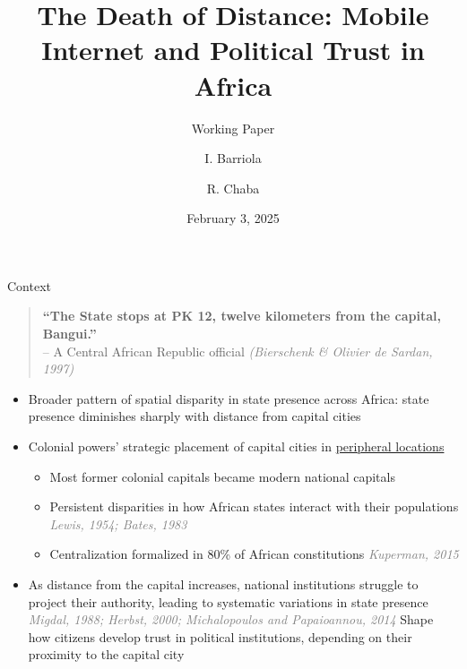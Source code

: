 \documentclass[10pt]{beamer}
\newenvironment{hidepagenumberframe}
  {\setbeamertemplate{footline}{}\begin{frame}}
  {\end{frame}\setbeamertemplate{footline}{
     \hfill{\fontsize{8pt}{16pt}\selectfont\insertframenumber}\hspace{1em}}}
\begin{document}
\author[I. Barriola, R. Chaba]{I. Barriola \and R. Chaba}

\title{The Death of Distance: Mobile Internet and Political Trust in Africa}
\subtitle{Working Paper}
\date{February 3, 2025}


\begin{hidepagenumberframe}
    \titlepage
\end{hidepagenumberframe}

\begin{frame}{Context}
    \begin{quotation}
        \noindent \textbf{``The State stops at PK 12, twelve kilometers from the capital, Bangui.''}\\       
        \hfill -- A Central African Republic official \textcolor{gray}{\textit{(Bierschenk \& Olivier de Sardan, 1997)}} 
        \end{quotation}\smallskip \pause

    \begin{itemize}\setlength\itemsep{1em}
        \item Broader pattern of spatial disparity in state presence across Africa: state presence diminishes sharply with distance from
        capital cities \vfill \pause
        \item Colonial powers’ strategic placement of capital cities in \hyperlink{sample_map}{{peripheral locations}}
        \vfill \label{context}
        \begin{itemize}
            \item Most former colonial capitals became modern national capitals \vfill
            \item Persistent disparities in how African states
            interact with their populations \textcolor{gray}{\textit{Lewis, 1954; Bates, 1983}} \vfill
            \item Centralization formalized in 80\% of African constitutions \textcolor{gray}{\textit{Kuperman, 2015}} \vfill  \pause
        \end{itemize} 
        \item As distance from the capital
        increases, national institutions struggle to project their authority, leading to systematic
        variations in state presence \textcolor{gray}{\textit{Migdal, 1988; Herbst, 2000; Michalopoulos and Papaioannou,
        2014}} \vfill   \pause
        \vspace{1em}
        \centering Shape how citizens develop trust in political institutions, depending on their proximity to the capital city \vfill
    \end{itemize}
\end{frame}
\end{document}
